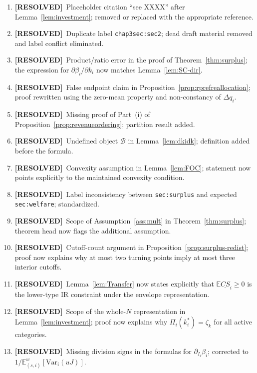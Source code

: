 \documentclass{class}
\newcommand{\ok}{\textcolor{ok}{\textbf{[RESOLVED]}}}
\begin{document}
\begin{enumerate}[leftmargin=1.5cm]
\item \ok\ Placeholder citation ``see XXXX'' after Lemma~\ref{lem:investment}; removed or replaced with the appropriate reference.

\item \ok\ Duplicate label \texttt{chap3sec:sec2}; dead draft material removed and label conflict eliminated.

\item \ok\ Product/ratio error in the proof of Theorem~\ref{thm:surplus}; the expression for
$\partial\beta_i/\partial k_i$ now matches Lemma~\ref{lem:SC-dir}.

\item \ok\ False endpoint claim in Proposition~\ref{prop:rprefreallocation}; proof rewritten using the zero-mean property and non-constancy of $\Delta q_i$.

\item \ok\ Missing proof of Part~(i) of Proposition~\ref{prop:revenueordering}; partition result added.

\item \ok\ Undefined object $\mathcal{B}$ in Lemma~\ref{lem:dkidk}; definition added before the formula.

\item \ok\ Convexity assumption in Lemma~\ref{lem:FOC}; statement now points explicitly to the maintained convexity condition.

\item \ok\ Label inconsistency between \texttt{sec:surplus} and expected \texttt{sec:welfare}; standardized.

\item \ok\ Scope of Assumption~\ref{ass:mult} in Theorem~\ref{thm:surplus}; theorem head now flags the additional assumption.

\item \ok\ Cutoff-count argument in Proposition~\ref{prop:surplus-redist}; proof now explains why at most two turning points imply at most three interior cutoffs.

\item \ok\ Lemma~\ref{lem:Transfer} now states explicitly that
$\mathbb{E}\underline{CS}_i\geq 0$ is the lower-type IR constraint under the envelope representation.

\item \ok\ Scope of the whole-$N$ representation in Lemma~\ref{lem:investment}; proof now explains why $\Pi_i(k_i^\ast)=\zeta_k$ for all active categories.

\item \ok\ Missing division signs in the formulas for
$\partial_{I_i}\beta_i$; corrected to
$1/\mathbb{E}_{(s,i)}^w[\mathrm{Var}_i(uJ)]$.


\end{enumerate}
\end{document}
